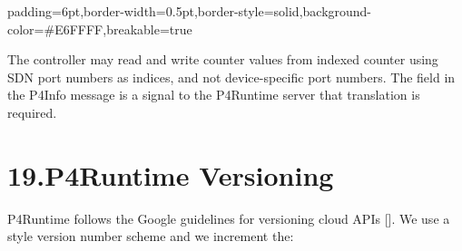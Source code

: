 \documentclass[11pt]{article}
\begin{document}
{%
\begin{mdbmargintb}{6pt}{6pt}%
\begin{mdblock}{padding=6pt,border-width=0.5pt,border-style=solid,background-color=\#E6FFFF,breakable=true}%
\begin{mdpre}%
\end{mdpre}%
\end{mdblock}%
\end{mdbmargintb}%

\noindent{}The controller may read and write counter values from indexed counter 
using SDN port numbers as indices, and not device-specific port numbers. The
 field in the P4Info message is a signal to the P4Runtime
server that translation is required.%

\section{19.\hspace*{0.5em}P4Runtime Versioning}\label{sec-p4runtime-versioning}%

\noindent{}P4Runtime follows the Google guidelines for versioning cloud APIs
[]. We use a  style version number scheme and
we increment the:%

}
\end{document}
